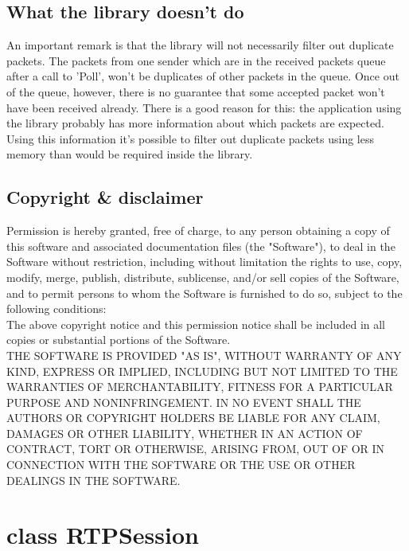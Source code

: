 \subsection{What the library doesn't do}

An important remark is that the library will not necessarily filter out 
duplicate packets. The packets from one sender which are in the received packets
queue after a call to 'Poll', won't be duplicates of other packets in the queue.
Once out of the queue, however, there is no guarantee that some accepted packet 
won't have been received already. 
There is a good reason for this: the application using the library probably has
more information about which packets are expected. Using this information it's 
possible to filter out duplicate packets using less memory than would be 
required inside the library.

\subsection{Copyright \& disclaimer}

  Permission is hereby granted, free of charge, to any person obtaining a
  copy of this software and associated documentation files (the "Software"),
  to deal in the Software without restriction, including without limitation
  the rights to use, copy, modify, merge, publish, distribute, sublicense,
  and/or sell copies of the Software, and to permit persons to whom the
  Software is furnished to do so, subject to the following conditions:\\

  The above copyright notice and this permission notice shall be included
  in all copies or substantial portions of the Software.\\

  THE SOFTWARE IS PROVIDED "AS IS", WITHOUT WARRANTY OF ANY KIND, EXPRESS
  OR IMPLIED, INCLUDING BUT NOT LIMITED TO THE WARRANTIES OF MERCHANTABILITY,
  FITNESS FOR A PARTICULAR PURPOSE AND NONINFRINGEMENT.  IN NO EVENT SHALL
  THE AUTHORS OR COPYRIGHT HOLDERS BE LIABLE FOR ANY CLAIM, DAMAGES OR OTHER
  LIABILITY, WHETHER IN AN ACTION OF CONTRACT, TORT OR OTHERWISE, ARISING
  FROM, OUT OF OR IN CONNECTION WITH THE SOFTWARE OR THE USE OR OTHER DEALINGS
  IN THE SOFTWARE.

\section{class RTPSession}

